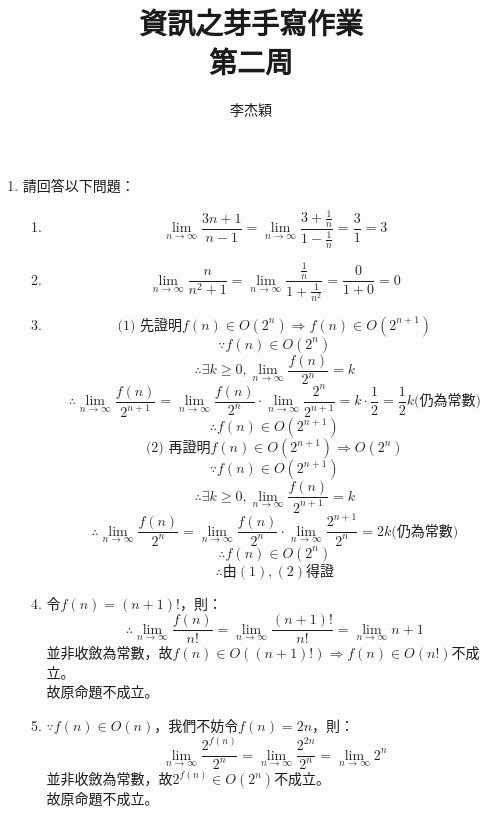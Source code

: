 \documentclass[12pt,a4paper]{article}
\title{資訊之芽手寫作業\\第二周}
\author{李杰穎}
\date{}
\begin{document}
\maketitle
\begin{enumerate}
\item 請回答以下問題：
    \begin{enumerate}
        \item $$\lim_{n\to\infty}\frac{3n+1}{n-1} = \lim_{n\to\infty}\frac{3+\frac{1}{n}}{1-\frac{1}{n}} = \frac{3}{1} = 3 $$
        \item $$\lim_{n\to\infty}\frac{n}{n^2+1}=\lim_{n\to\infty}\frac{\frac{1}{n}}{1+\frac{1}{n^2}}=\frac{0}{1+0}=0$$
        \item%
            $$\textrm{(1) 先證明}f(n)\in O(2^n)\Rightarrow f(n)\in O(2^{n+1})$$    
            $$\because f(n) \in O(2^n)$$
            $$\therefore \exists k \geq 0, \lim_{n\to\infty}\frac{f(n)}{2^n}=k$$
            $$\therefore \lim_{n\to\infty}\frac{f(n)}{2^{n+1}}=\lim_{n\to\infty}\frac{f(n)}{2^n}\cdot\lim_{n\to\infty}\frac{2^n}{2^{n+1}}=k\cdot \frac{1}{2}=\frac{1}{2}k \textrm{(仍為常數)}$$
            \begin{equation}
                \therefore f(n) \in O(2^{n+1})
            \end{equation}
            $$\textrm{(2) 再證明}f(n)\in O(2^{n+1})\Rightarrow O(2^n)$$
            $$\because f(n) \in O(2^{n+1})$$
            $$\therefore \exists k \geq 0, \lim_{n\to\infty}\frac{f(n)}{2^{n+1}}=k$$
            $$\therefore \lim_{n\to\infty}\frac{f(n)}{2^n}=\lim_{n\to\infty}\frac{f(n)}{2^n}\cdot\lim_{n\to\infty}\frac{2^{n+1}}{2^n}=2k\textrm{(仍為常數)}$$
            \begin{equation}
                \therefore f(n) \in O(2^{n})
            \end{equation}
            $$\therefore \textrm{由}(1), (2)\textrm{得證}$$
        \item%
            令$f(n)=(n+1)!$，則：
            $$\therefore \lim_{n\to\infty}\frac{f(n)}{n!}=\lim_{n\to\infty}\frac{(n+1)!}{n!}=\lim_{n\to\infty}n+1$$
            並非收斂為常數，故$f(n)\in O((n+1)!)\Rightarrow f(n) \in O(n!)$不成立。\\
            故原命題不成立。
        \item%
        $\because f(n) \in O(n)$，我們不妨令$f(n)=2n$，則：
        $$\lim_{n\to\infty}\frac{2^{f(n)}}{2^n}=\lim_{n\to\infty}\frac{2^{2n}}{2^n}=\lim_{n\to\infty}2^n$$
        並非收斂為常數，故$2^{f(n)} \in O(2^n)$不成立。\\
        故原命題不成立。

\end{enumerate}
\end{enumerate}
\end{document}
